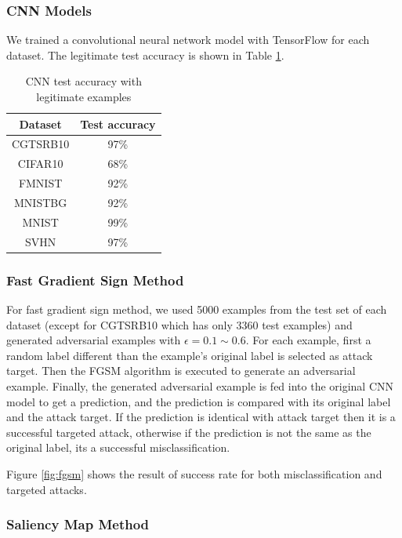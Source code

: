 \documentclass{article}
\begin{document}
\subsubsection{CNN Models}

We trained a convolutional neural network model with TensorFlow\cite{tensorflow} for each dataset.
The legitimate test accuracy is shown in Table \ref{tab:cnnaccuracy}.

\begin{table}
\centering
\begin{tabular}{cc}
    \toprule
    Dataset & Test accuracy \\
    \midrule
    CGTSRB10 & 97\% \\
    CIFAR10 & 68\%  \\
    FMNIST & 92\% \\
    MNISTBG & 92\% \\
    MNIST & 99\% \\
    SVHN & 97\% \\
    \bottomrule
\end{tabular}
\caption{\label{tab:cnnaccuracy} CNN test accuracy with legitimate examples}
\end{table}


\subsubsection{Fast Gradient Sign Method}

For fast gradient sign method, we used 5000 examples from the test set of each dataset (except for CGTSRB10 which has only 3360 test examples)
and generated adversarial examples with \(\epsilon=0.1 \sim 0.6\).
For each example, first a random label different than the example's original label is selected as attack target.
Then the FGSM algorithm is executed to generate an adversarial example.
Finally, the generated adversarial example is fed into the original CNN model to get a prediction,
and the prediction is compared with its original label and the attack target.
If the prediction is identical with attack target then it is a successful targeted attack,
otherwise if the prediction is not the same as the original label, its a successful misclassification.

Figure \ref{fig:fgsm} shows the result of success rate for both misclassification and targeted attacks.

\subsubsection{Saliency Map Method}
\end{document}
